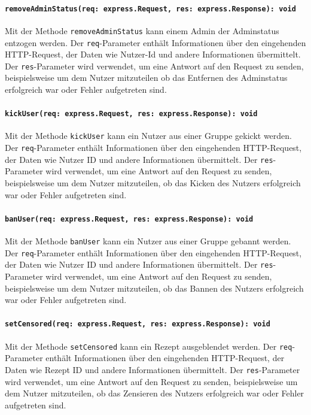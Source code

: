 \documentclass{entwurfsheft}
\begin{document}
\paragraph{\texttt{removeAdminStatus(req: express.Request, res: express.Response): void}}
Mit der Methode \texttt{removeAdminStatus} kann einem Admin der Adminstatus entzogen werden. Der \texttt{req}-Parameter enthält Informationen über den eingehenden HTTP-Request, der Daten wie Nutzer-Id und andere Informationen übermittelt. Der \texttt{res}-Parameter wird verwendet, um eine Antwort auf den Request zu senden, beispielsweise um dem Nutzer mitzuteilen ob das Entfernen des Adminstatus erfolgreich war oder Fehler aufgetreten sind.
\paragraph{\texttt{kickUser(req: express.Request, res: express.Response): void}}
Mit der Methode \texttt{kickUser} kann ein Nutzer aus einer Gruppe gekickt werden. Der \texttt{req}-Parameter enthält Informationen über den eingehenden HTTP-Request, der Daten wie Nutzer ID und andere Informationen übermittelt. Der \texttt{res}-Parameter wird verwendet, um eine Antwort auf den Request zu senden, beispielsweise um dem Nutzer mitzuteilen, ob das Kicken des Nutzers erfolgreich war oder Fehler aufgetreten sind.
\paragraph{\texttt{banUser(req: express.Request, res: express.Response): void}}
Mit der Methode \texttt{banUser} kann ein Nutzer aus einer Gruppe gebannt werden. Der \texttt{req}-Parameter enthält Informationen über den eingehenden HTTP-Request, der Daten wie Nutzer ID und andere Informationen übermittelt. Der \texttt{res}-Parameter wird verwendet, um eine Antwort auf den Request zu senden, beispielsweise um dem Nutzer mitzuteilen, ob das Bannen des Nutzers erfolgreich war oder Fehler aufgetreten sind.
\paragraph{\texttt{setCensored(req: express.Request, res: express.Response): void}}
Mit der Methode \texttt{setCensored} kann ein Rezept ausgeblendet werden. Der \texttt{req}-Parameter enthält Informationen über den eingehenden HTTP-Request, der Daten wie Rezept ID und andere Informationen übermittelt. Der \texttt{res}-Parameter wird verwendet, um eine Antwort auf den Request zu senden, beispielsweise um dem Nutzer mitzuteilen, ob das Zensieren des Nutzers erfolgreich war oder Fehler aufgetreten sind.
\end{document}
